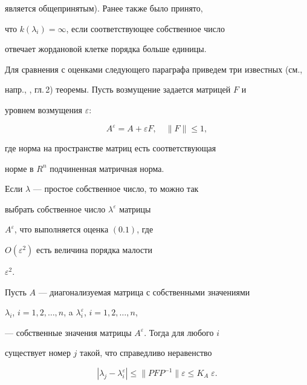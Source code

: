 является общепринятым). Ранее также было принято,


что $k(\lambda_i)=\infty$, если соответствующее собственное число 


отвечает жордановой клетке порядка больше единицы.





Для сравнения с оценками следующего параграфа приведем три известных (см.,


напр., \cite{LI}, гл.\,2) теоремы. Пусть возмущение задается матрицей $F$ и


уровнем возмущения $\varepsilon$:


\begin{equation}


A^{\varepsilon}=A+\varepsilon F,\quad \|F\|\le 1,


\end{equation}


где норма на пространстве матриц есть соответствующая 


норме в $R^n$ подчиненная матричная норма.





\begin{thm}


Если $\lambda$ --- простое собственное число, то можно так


выбрать собственное число $\lambda^{\varepsilon}$ матрицы


$A^{\varepsilon}$, что выполняется оценка $(0.1)$, где


$O(\varepsilon^2)$ есть величина порядка малости


$\varepsilon^2$.


\end{thm}





\begin{thm}


Пусть $A$ --- диагонализуемая матрица с собственными значениями


$\lambda_i$, $i=1,2,\dotsc,n$, a $\lambda_i^{\varepsilon}$, $i=1,2,\dotsc,n$,


--- собственные значения матрицы $A^{\varepsilon}$. Тогда для любого $i$


существует номер $j$ такой, что справедливо неравенство


$$


|\lambda_j-\lambda_i^{\varepsilon}|\le \|P F P ^{-1}\|\varepsilon\le


K_A\;\varepsilon.


$$


\end{thm}





